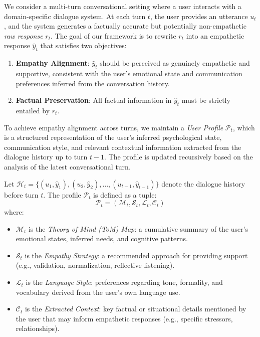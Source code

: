 \documentclass[11pt]{article}
\begin{document}
We consider a multi-turn conversational setting where a user interacts with a domain-specific dialogue system. At each turn $t$, the user provides an utterance $u_t$, and the system generates a factually accurate but potentially non-empathetic \textit{raw response} $r_t$. The goal of our framework is to rewrite $r_t$ into an empathetic response $\hat{y}_t$ that satisfies two objectives:
\begin{enumerate}
    \item \textbf{Empathy Alignment}: $\hat{y}_t$ should be perceived as genuinely empathetic and supportive, consistent with the user's emotional state and communication preferences inferred from the conversation history.
    \item \textbf{Factual Preservation}: All factual information in $\hat{y}_t$ must be strictly entailed by $r_t$. 
\end{enumerate}

To achieve empathy alignment across turns, we maintain a \textit{User Profile} $\mathcal{P}_t$, which is a structured representation of the user's inferred psychological state, communication style, and relevant contextual information extracted from the dialogue history up to turn $t-1$. The profile is updated recursively based on the analysis of the latest conversational turn.

Let $\mathcal{H}_t = \{(u_1, \hat{y}_1), (u_2, \hat{y}_2), \dots, (u_{t-1}, \hat{y}_{t-1})\}$ denote the dialogue history before turn $t$. The profile $\mathcal{P}_t$ is defined as a tuple:
\begin{equation}
    \mathcal{P}_t = (\mathcal{M}_t, \mathcal{S}_t, \mathcal{L}_t, \mathcal{C}_t)
\end{equation}
where:
\begin{itemize}
    \item $\mathcal{M}_t$ is the \textit{Theory of Mind (ToM) Map}: a cumulative summary of the user's emotional states, inferred needs, and cognitive patterns.
    \item $\mathcal{S}_t$ is the \textit{Empathy Strategy}: a recommended approach for providing support (e.g., validation, normalization, reflective listening).
    \item $\mathcal{L}_t$ is the \textit{Language Style}: preferences regarding tone, formality, and vocabulary derived from the user's own language use.
    \item $\mathcal{C}_t$ is the \textit{Extracted Context}: key factual or situational details mentioned by the user that may inform empathetic responses (e.g., specific stressors, relationships).
\end{itemize}
\end{document}
